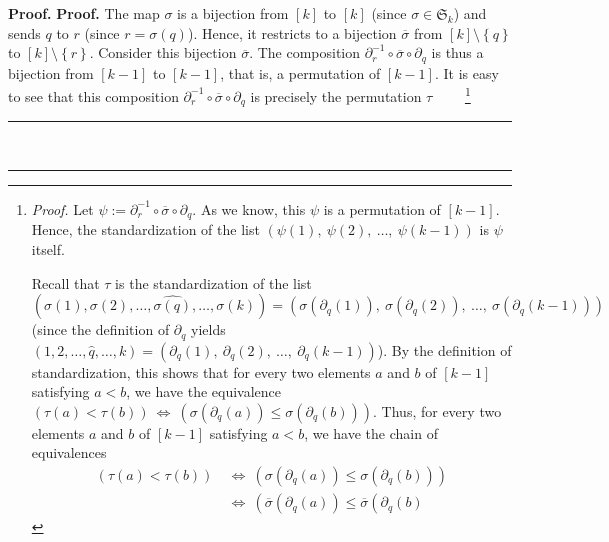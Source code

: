 \documentclass[numbers=enddot,12pt,final,onecolumn,notitlepage]{scrartcl}%
\theoremstyle{definition}
\newenvironment{fineprint}{\begin{small}}{\end{small}}
\newenvironment{proof}[1][Proof]{\noindent\textbf{#1.} }{\ \rule{0.5em}{0.5em}}
\begin{document}
\begin{fineprint}
\begin{proof}
\begin{proof}
The map $\sigma$ is a bijection from $\left[  k\right]  $ to $\left[
k\right]  $ (since $\sigma\in\mathfrak{S}_{k}$) and sends $q$ to $r$ (since
$r=\sigma\left(  q\right)  $). Hence, it restricts to a bijection
$\overline{\sigma}$ from $\left[  k\right]  \setminus\left\{  q\right\}  $ to
$\left[  k\right]  \setminus\left\{  r\right\}  $. Consider this bijection
$\overline{\sigma}$. The composition $\partial_{r}^{-1}\circ\overline{\sigma
}\circ\partial_{q}$ is thus a bijection from $\left[  k-1\right]  $ to
$\left[  k-1\right]  $, that is, a permutation of $\left[  k-1\right]  $. It
is easy to see that this composition $\partial_{r}^{-1}\circ\overline{\sigma
}\circ\partial_{q}$ is precisely the permutation $\tau$%
\ \ \ \ \footnote{\textit{Proof.} Let $\psi:=\partial_{r}^{-1}\circ
\overline{\sigma}\circ\partial_{q}$. As we know, this $\psi$ is a permutation
of $\left[  k-1\right]  $. Hence, the standardization of the list $\left(
\psi\left(  1\right)  ,\ \psi\left(  2\right)  ,\ \ldots,\ \psi\left(
k-1\right)  \right)  $ is $\psi$ itself.
\par
Recall that $\tau$ is the standardization of the list
\[
\left(  \sigma\left(  1\right)  ,\sigma\left(  2\right)  ,\ldots
,\widehat{\sigma\left(  q\right)  },\ldots,\sigma\left(  k\right)  \right)
=\left(  \sigma\left(  \partial_{q}\left(  1\right)  \right)  ,\ \sigma\left(
\partial_{q}\left(  2\right)  \right)  ,\ \ldots,\ \sigma\left(  \partial
_{q}\left(  k-1\right)  \right)  \right)
\]
(since the definition of $\partial_{q}$ yields $\left(  1,2,\ldots
,\widehat{q},\ldots,k\right)  =\left(  \partial_{q}\left(  1\right)
,\ \partial_{q}\left(  2\right)  ,\ \ldots,\ \partial_{q}\left(  k-1\right)
\right)  $). By the definition of standardization, this shows that for every
two elements $a$ and $b$ of $\left[  k-1\right]  $ satisfying $a<b$, we have
the equivalence $\left(  \tau\left(  a\right)  <\tau\left(  b\right)  \right)
\ \Longleftrightarrow\ \left(  \sigma\left(  \partial_{q}\left(  a\right)
\right)  \leq\sigma\left(  \partial_{q}\left(  b\right)  \right)  \right)  $.
Thus, for every two elements $a$ and $b$ of $\left[  k-1\right]  $ satisfying
$a<b$, we have the chain of equivalences%
\begin{align*}
\left(  \tau\left(  a\right)  <\tau\left(  b\right)  \right)  \  &
\Longleftrightarrow\ \left(  \sigma\left(  \partial_{q}\left(  a\right)
\right)  \leq\sigma\left(  \partial_{q}\left(  b\right)  \right)  \right) \\
&  \Longleftrightarrow\ \left(  \overline{\sigma}\left(  \partial_{q}\left(
a\right)  \right)  \leq\overline{\sigma}\left(  \partial_{q}\left(  b\right)

\end{align*}}
\end{proof}
\end{proof}
\end{fineprint}
\end{document}
